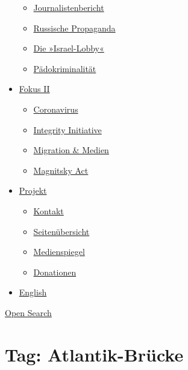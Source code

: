 \begin{itemize}
  \begin{itemize}
  \tightlist
  \item
    \href{https://swprs.org/bericht-eines-journalisten/}{Journalistenbericht}
  \item
    \href{https://swprs.org/russische-propaganda/}{Russische Propaganda}
  \item
    \href{https://swprs.org/die-israel-lobby-fakten-und-mythen/}{Die
    »Israel-Lobby«}
  \item
    \href{https://swprs.org/geopolitik-und-paedokriminalitaet/}{Pädokriminalität}
  \end{itemize}
\item
  \href{https://swprs.org/migration-und-medien/}{Fokus II}

  \begin{itemize}
  \tightlist
  \item
    \href{https://swprs.org/covid-19-hinweis-ii/}{Coronavirus}
  \item
    \href{https://swprs.org/die-integrity-initiative/}{Integrity
    Initiative}
  \item
    \href{https://swprs.org/migration-und-medien/}{Migration \& Medien}
  \item
    \href{https://swprs.org/der-fall-magnitsky/}{Magnitsky Act}
  \end{itemize}
\item
  \href{https://swprs.org/kontakt/}{Projekt}

  \begin{itemize}
  \tightlist
  \item
    \href{https://swprs.org/kontakt/}{Kontakt}
  \item
    \href{https://swprs.org/uebersicht/}{Seitenübersicht}
  \item
    \href{https://swprs.org/medienspiegel/}{Medienspiegel}
  \item
    \href{https://swprs.org/donationen/}{Donationen}
  \end{itemize}
\item
  \href{https://swprs.org/contact/}{English}
\end{itemize}

\protect\hyperlink{}{Open Search}

\hypertarget{tag-atlantik-bruxfccke}{%
\section{Tag: Atlantik-Brücke}\label{tag-atlantik-bruxfccke}}

